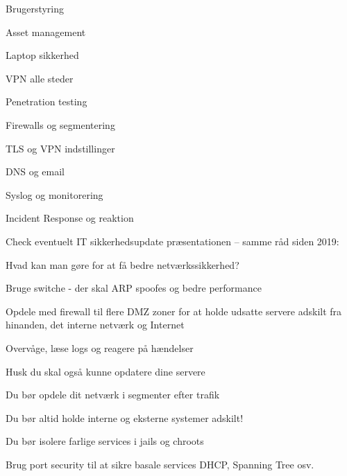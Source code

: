 \documentclass[Screen16to9,17pt]{foils}
\begin{document}
\begin{list2}
\item Brugerstyring
\item Asset management
\item Laptop sikkerhed
\item VPN alle steder
\item Penetration testing
\item Firewalls og segmentering
\item TLS og VPN indstillinger
\item DNS og email
\item Syslog og monitorering
\item Incident Response og reaktion
\end{list2}

Check eventuelt IT sikkerhedsupdate præsentationen -- samme råd siden 2019:\\
{\small{}}


\begin{list1}
\item Hvad kan man gøre for at få bedre netværkssikkerhed?
\begin{list2}
\item Bruge switche - der skal ARP spoofes og bedre performance
\item Opdele med firewall til flere DMZ zoner for at holde
      udsatte servere adskilt fra hinanden, det interne netværk og
      Internet
\item Overvåge, læse logs og reagere på hændelser
\end{list2}
\item Husk du skal også kunne opdatere dine servere
\end{list1}



\begin{list1}
\item Du bør opdele dit netværk i segmenter efter trafik
\item Du bør altid holde interne og eksterne systemer adskilt!
\item Du bør isolere farlige services i jails og chroots
\item Brug port security til at sikre basale services DHCP, Spanning Tree osv.
\end{list1}







\slidenext
\end{document}
